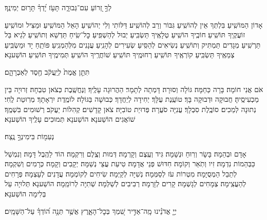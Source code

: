 \documentclass[twoside, openany, parskip=half, 11pt]{book}
\begin{document}
לְךָ֣ זְ֭רוֹעַ עִם־גְּבוּרָ֑ה תָּעֹ֥ז יָ֝דְךָ֗ תָּר֥וּם יְמִינֶֽךָ׃



אָדוֹן הַמּוֹשִֽׁיעַ׃ בִּלְתְּךָ אֵין לְהוֹשִֽׁיעַ׃ גִּבּוֹר וְרַב לְהוֹשִֽׁיע׃ דַּלּוֹתִי וְלִי יְהוֹשִֽׁיעַ׃ הָאֵל הַמּוֹשִֽׁיעַ׃ וּמַצִּיל וּמוֹשִֽׁיעַ׃ זוֹעֲקֶֽיךָ תּוֹשִֽׁיעַ׃ חוֹכֶֽיךָ הוֹשִֽׁיעַ׃ טְלָאֶֽיךָ תַּשְׂבִּֽיעַ׃ יְבוּל לְהַשְׁפִּֽיעַ׃ כׇּל־שִֽׂיחַ תַּדְשֵׁא וְתוֹשִֽׁיעַ׃ לְגֵיא בַּל תַּרְשִֽׁיעַ׃ מְגָדִים תַּמְתִּיק וְתוֹשִֽׁיעַ׃ נְשִׂיאִים לְהַסִּֽיעַ׃ שְׂעִירִים לְהָנִֽיעַ׃ עֲנָנִים מִלְּהַמְנִֽיעַ׃ פּוֹתֵֽחַ יָד וּמַשְׂבִּֽיעַ׃ צְמֵאֶֽיךָ תַּשְׂבִּֽיעַ׃ קוֹרְאֶֽיךָ תּוֹשִֽׁיעַ׃ רְחוּמֶֽיךָ תּוֹשִֽׁיעַ׃
שׁוֹחֲרֶֽיךָ הוֹשִֽׁיעַ׃
תְּמִימֶֽיךָ תּוֹשִֽׁיעַ׃ הוֹשַׁענָא׃

תִּתֵּ֤ן אֱמֶת֙ לְיַֽעֲקֹ֔ב חֶ֖סֶד לְאַבְרָהָ֑ם׃


אֹם אֲנִי חוֹמָה׃ בָּרָה כַּחַמָּה׃ גּוֹלָה וְסוּרָה׃ דָּמְתָה לְתָמָר׃ הַהֲרוּגָה עָלֶֽיךָ׃ וְנֶחֱשֶֽׁבֶת כְּצֹאן טִבְחָה׃ זְרוּיָה בֵּין מַכְעִיסֶֽיהָ׃ חֲבוּקָה וּדְבוּקָה בָּךְ׃ טוֹעֶֽנֶת עֻלָּךְ׃ יְחִידָה לְיַחֲדָךְ׃ כְּבוּשָׁה בַּגּוֹלָה׃ לוֹמֶֽדֶת יִרְאָתָךְ׃ מְרֽוּטַת לֶֽחִי׃ נְתוּנָה לְמַכִים׃ סוֹבֶֽלֶת סִבְלָךְ׃ עֲנִיָּה סֹעֲרָה׃ פְּדוּיַת טוֹבִיָּה׃ צֹאן קָדָשִׁים׃ קְהִלּוֹת יַעֲקֹב׃ רְשׁוּמִים בִּשְׁמֶֽךָ׃ שׁוֹאֲגִים הוֹשַׁענָא׃ הוֹשַׁענָא תְּמוּכִים עָלֶֽיךָ הוֹשַׁענָא׃

נְעִמ֖וֹת בִּימִינְךָ֣ נֶֽצַח׃


אָדָם וּבְהֵמָה׃ בָּשָׂר וְרֽוּחַ וּנְשָׁמָה׃ גִּיד וְעֶֽצֶם וְקָרְמָה׃ דְּמוּת וְצֶֽלֶם וְרִקְמָה׃ הוֹד לַהֶֽבֶל דָּמָה׃ וְנִמְשַׁל כַּבְּהֵמוֹת נִדְמָה׃ זִיו וְתֹֽאַר וְקוֹמָה׃ חִדּוּשׁ פְּנֵי אֲדָמָה׃ טִיעַת עֲצֵי נְשַׁמָּה׃ יְקָבִים וְקָמָה׃ כְּרָמִים וְשִׁקְמָה׃ לְתֵבֵל הַמְסֻיָּמָה׃ מִטְרוֹת עֹז לְסַמְּמָה׃ נְשִׁיָּה לְקַיְּמָה׃ שִׂיחִים לְקוֹמְמָה׃ עֲדָנִים לְעָצְמָה׃ פְּרָחִים לְהַעֲצִֽימָה׃ צְמָחִים לְגָשְׁמָה׃ קָרִים לְזָרְמָה׃ רְבִיבִים לְשַׁלְּמָה׃
שְׁתִיָּה לְרוֹמֵֽמָה׃ הוֹשַׁענָא׃
תְּלוּיָה עַל בְּלִימָה הוֹשַׁענָא׃

יְיָ֤ אֲדֹנֵ֗ינוּ מָֽה־אַדִּ֣יר שִׁ֭מְךָ בְּכׇל־הָאָ֑רֶץ אֲשֶׁ֥ר תְּנָ֥ה ה֝וֹדְךָ֗ עַל־הַשָּׁמָֽיִם׃
\end{document}
